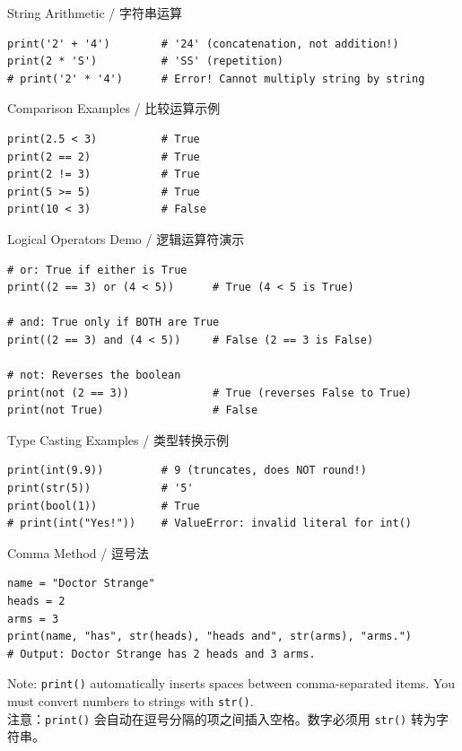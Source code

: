 \documentclass[11pt,a4paper]{report}
\let\oldtexttt\texttt
\renewcommand{\texttt}[1]{\textcolor{mainblue}{\oldtexttt{#1}}}
\begin{document}
\begin{examplebox}{String Arithmetic / 字符串运算}
\begin{lstlisting}
print('2' + '4')        # '24' (concatenation, not addition!)
print(2 * 'S')          # 'SS' (repetition)
# print('2' * '4')      # Error! Cannot multiply string by string
\end{lstlisting}
\end{examplebox}

\begin{examplebox}{Comparison Examples / 比较运算示例}
\begin{lstlisting}
print(2.5 < 3)          # True
print(2 == 2)           # True
print(2 != 3)           # True
print(5 >= 5)           # True
print(10 < 3)           # False
\end{lstlisting}
\end{examplebox}

\begin{examplebox}{Logical Operators Demo / 逻辑运算符演示}
\begin{lstlisting}
# or: True if either is True
print((2 == 3) or (4 < 5))      # True (4 < 5 is True)

# and: True only if BOTH are True
print((2 == 3) and (4 < 5))     # False (2 == 3 is False)

# not: Reverses the boolean
print(not (2 == 3))             # True (reverses False to True)
print(not True)                 # False
\end{lstlisting}
\end{examplebox}

\begin{examplebox}{Type Casting Examples / 类型转换示例}
\begin{lstlisting}
print(int(9.9))         # 9 (truncates, does NOT round!)
print(str(5))           # '5'
print(bool(1))          # True
# print(int("Yes!"))    # ValueError: invalid literal for int()
\end{lstlisting}
\end{examplebox}

\begin{examplebox}{Comma Method / 逗号法}
\begin{lstlisting}
name = "Doctor Strange"
heads = 2
arms = 3
print(name, "has", str(heads), "heads and", str(arms), "arms.")
# Output: Doctor Strange has 2 heads and 3 arms.
\end{lstlisting}
    Note: \texttt{print()} automatically inserts spaces between comma-separated items. You must convert numbers to strings with \texttt{str()}. \\
    注意：\texttt{print()} 会自动在逗号分隔的项之间插入空格。数字必须用 \texttt{str()} 转为字符串。
\end{examplebox}
\end{document}
